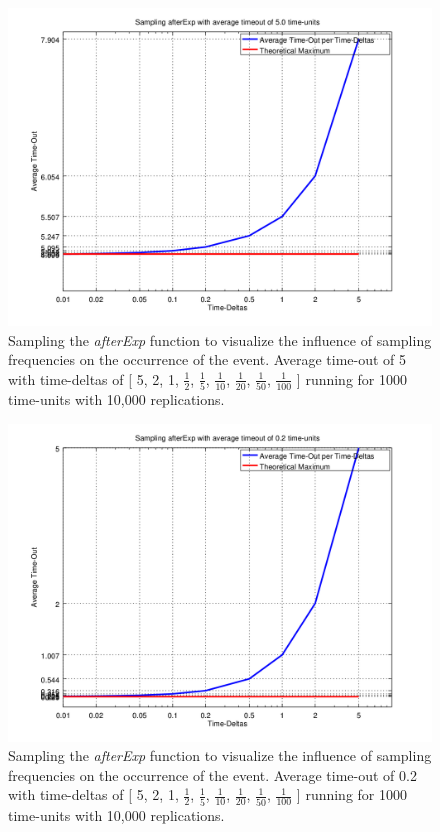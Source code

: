 \begin{figure}
	\centering
	\includegraphics[width=.6\textwidth, angle=0]{./../shared/fig/samplingTest_afterExp_5time.png}
	\caption{Sampling the \textit{afterExp} function to visualize the influence of sampling frequencies on the occurrence of the event. Average time-out of 5 with time-deltas of [ 5, 2, 1, $\frac{1}{2}$, $\frac{1}{5}$, $\frac{1}{10}$, $\frac{1}{20}$, $\frac{1}{50}$, $\frac{1}{100}$ ] running for 1000 time-units with 10,000 replications.}
	\label{fig:sampling_afterExp_5time}
\end{figure}

\begin{figure}
	\centering
	\includegraphics[width=.6\textwidth, angle=0]{./../shared/fig/samplingTest_afterExp_02time.png}
	\caption{Sampling the \textit{afterExp} function to visualize the influence of sampling frequencies on the occurrence of the event. Average time-out of 0.2 with time-deltas of [ 5, 2, 1, $\frac{1}{2}$, $\frac{1}{5}$, $\frac{1}{10}$, $\frac{1}{20}$, $\frac{1}{50}$, $\frac{1}{100}$ ] running for 1000 time-units with 10,000 replications.}
	\label{fig:sampling_afterExp_5time}
\end{figure}

